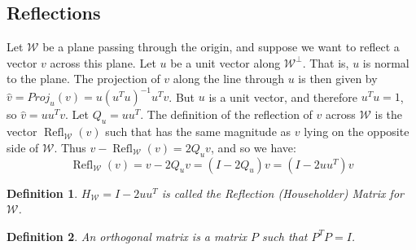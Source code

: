 \documentclass[oneside]{book}
\theoremstyle{mystyle}
\newtheorem{definition}{Definition}[section]
\DeclareMathOperator{\Refl}{Refl}
\begin{document}
\subsection{Reflections}
Let $\mathcal{W}$ be a plane passing through the origin, and suppose we want to reflect a vector $v$ across this plane. Let $u$ be a unit vector along $\mathcal{W}^{\perp}$. That is, $u$ is normal to the plane. The projection of $v$ along the line through $u$ is then given by $\hat{v} = Proj_{u}(v) = u(u^Tu)^{-1}u^Tv$. But $u$ is a unit vector, and therefore $u^Tu = 1$, so $\hat{v} = uu^T v$. Let $Q_u = uu^T$. The definition of the reflection of $v$ across $\mathcal{W}$ is the vector $\Refl_{\mathcal{W}}(v)$ such that has the same magnitude as $v$ lying on the opposite side of $\mathcal{W}$. Thus $v-\Refl_{\mathcal{W}}(v) = 2Q_u v$, and so we have:
\begin{equation*}
    \Refl_{\mathcal{W}}(v) = v-2Q_u v = (I-2Q_u)v =(I-2uu^T)v
\end{equation*}
\begin{definition}
$H_{\mathcal{W}} = I-2uu^T$ is called the Reflection (Householder) Matrix for $\mathcal{W}$.
\end{definition}
\begin{definition}
An orthogonal matrix is a matrix $P$ such that $P^TP = I$.
\end{definition}
\end{document}
